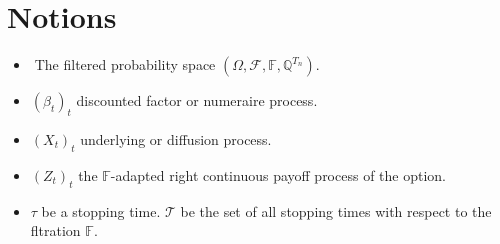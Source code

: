 \chapter*{Notions}
\normalsize
\begin{itemize}
    \item The filtered probability space $(\Omega,\mathcal{F},\mathbb{F},\mathbb{Q}^{T_{n}})$.
    \item $(\beta_{t})_{t}$ discounted factor or numeraire process.
    \item $(X_{t})_{t}$ underlying or diffusion process.
    \item $(Z_{t})_{t}$ the $\mathbb{F}$-adapted right continuous payoff process of the option.
    \item $\tau$ be a stopping time. $\mathcal{T}$ be the set of all stopping times with respect to the fltration $\mathbb{F}$.
\end{itemize}
